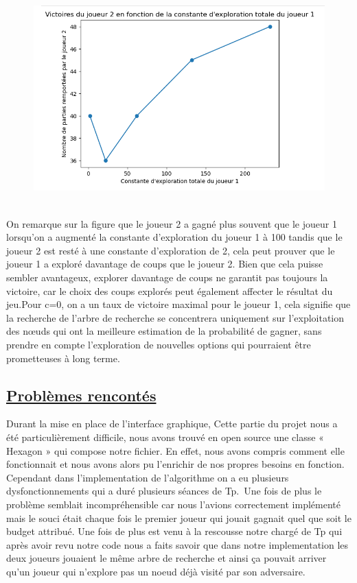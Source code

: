 \documentclass[12pt]{article}
\begin{document}
\begin{figure}[h!]
		\centering
		\includegraphics[width = 1\textwidth]{images/exp1.png}
		\caption{}
		\label{eq1}
	\end{figure}
 \\
 On remarque sur la figure  que le joueur 2 a gagné plus souvent que le joueur 1 lorsqu'on a augmenté la constante d'exploration du joueur 1 à 100 tandis que le joueur 2 est resté à une constante d'exploration de 2, cela peut prouver que le joueur 1 a exploré davantage de coups que le joueur 2. Bien que cela puisse sembler avantageux, explorer davantage de coups ne garantit pas toujours la victoire, car le choix des coups explorés peut également affecter le résultat du jeu.Pour c=0, on a un taux de victoire maximal pour le joueur 1, cela signifie que la recherche de l'arbre de recherche se concentrera uniquement sur l'exploitation des nœuds qui ont la meilleure estimation de la probabilité de gagner, sans prendre en compte l'exploration de nouvelles options qui pourraient être prometteuses à long terme.
\subsection{\underline{Problèmes rencontés}}
	Durant la mise en place de l'interface graphique, Cette partie du projet nous a été particulièrement diﬃcile, nous avons
trouvé en open source une classe « Hexagon » qui compose  notre fichier. En
eﬀet, nous avons compris comment elle fonctionnait et nous avons alors pu l’enrichir de
nos propres besoins en fonction.
	\\
    Cependant dans l'implementation de l'algorithme on a eu plusieurs dysfonctionnements qui a duré plusieurs séances de Tp. Une fois de plus le problème semblait incompréhensible car nous l'avions correctement implémenté mais le souci était chaque fois le premier joueur qui jouait gagnait  quel que soit le budget attribué. Une fois de plus est venu à la rescousse notre chargé de Tp qui après avoir revu notre code nous a faits savoir que dans notre implementation  les deux joueurs jouaient le même arbre de recherche et ainsi ça pouvait arriver qu'un joueur qui n'explore pas un noeud déjà visité par son adversaire.
    \\
    
\end{document}
